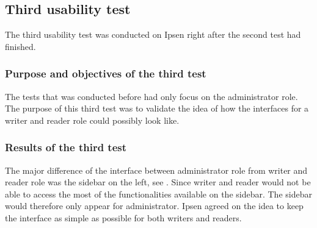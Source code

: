 

\subsection{Third usability test}\label{thirdtest}
The third usability test was conducted on Ipsen right after the second test had finished.

\subsubsection*{Purpose and objectives of the third test}
The tests that was conducted before had only focus on the administrator role.
The purpose of this third test was to validate the idea of how the interfaces for a writer and reader role could possibly look like.

\subsubsection*{Results of the third test}
The major difference of the interface between administrator role from writer and reader role was the sidebar on the left, see .
Since writer and reader would not be able to access the most of the functionalities available on the sidebar.
The sidebar would therefore only appear for administrator.
Ipsen agreed on the idea to keep the interface as simple as possible for both writers and readers.

